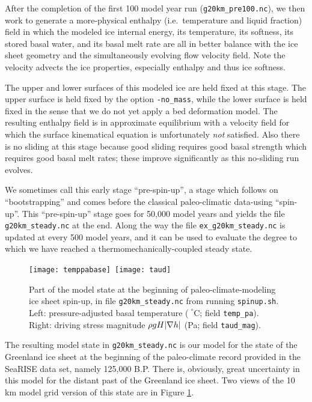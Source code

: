 After the completion of the first 100 model year run (\texttt{g20km_pre100.nc}), we then work to generate a more-physical enthalpy (i.e.~temperature and liquid fraction) field in which the modeled ice internal energy, its temperature, its softness, its stored basal water, and its basal melt rate are all in better balance with the ice sheet geometry and the simultaneously evolving flow velocity field.  Note the velocity advects the ice properties, especially enthalpy and thus ice softness.

The upper and lower surfaces of this modeled ice are held fixed at this stage.  The upper surface is held fixed by the option \texttt{-no_mass}, while the lower surface is held fixed in the sense that we do not yet apply a bed deformation model.  The resulting enthalpy field is in approximate equilibrium with a velocity field for which the surface kinematical equation \cite{Fowler} is unfortunately \emph{not} satisfied.  Also there is no sliding at this stage because good sliding requires good basal strength which requires good basal melt rates; these improve significantly as this no-sliding run evolves.

We sometimes call this early stage ``pre-spin-up'', a stage which follows on ``bootstrapping'' and comes before the classical paleo-climatic data-using ``spin-up''.  This ``pre-spin-up'' stage goes for 50,000 model years and yields the file \texttt{g20km_steady.nc} at the end.  Along the way the file \texttt{ex_g20km_steady.nc} is updated at every 500 model years, and it can be used to evaluate the degree to which we have reached a thermomechanically-coupled steady state.


\begin{figure}[ht]
\centering
\mbox{\texttt{[image: temppabase]}
  \qquad \texttt{[image: taud]}}
\caption{Part of the model state at the beginning of paleo-climate-modeling ice sheet spin-up, in file \texttt{g20km_steady.nc} from running \texttt{spinup.sh}.  Left: pressure-adjusted basal temperature ($\phantom{|}^\circ$C; field \texttt{temp_pa}).  Right: driving stress magnitude $\rho g H |\nabla h|$ (Pa; field \texttt{taud_mag}).}
\label{fig:sr-spinstart}
\end{figure}

The resulting model state in \texttt{g20km_steady.nc} is our model for the state of the Greenland ice sheet at the beginning of the paleo-climate record provided in the SeaRISE data set, namely 125,000 B.P.  There is, obviously, great uncertainty in this model for the distant past of the Greenland ice sheet.  Two views of the 10\,km model grid version of this state are in Figure \ref{fig:sr-spinstart}.

